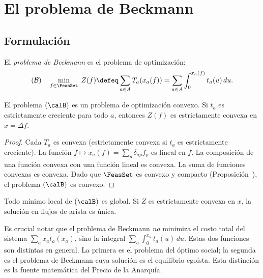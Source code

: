 \label{cap:beckmann}

\section{El problema de Beckmann}

\subsection{Formulación}


\begin{definition}\label{def:beckmann}
El \emph{problema de Beckmann} es el problema de optimización:
\begin{equation}\label{eq:beckmann}
(\mathcal{B}) \quad \min_{f \in \FeasSet} \; Z(f) \defeq \sum_{a \in A} T_a(x_a(f)) = \sum_{a \in A} \int_0^{x_a(f)} t_a(u) \, du.
\end{equation}
\end{definition}

\begin{proposition}\label{prop:beckmann_convex}
El problema $(\calB)$ es un problema de optimización convexo. Si $t_a$ es estrictamente creciente para todo $a$, entonces $Z(f)$ es estrictamente convexa en $x = \Delta f$.
\end{proposition}

\begin{proof}
Cada $T_a$ es convexa (estrictamente convexa si $t_a$ es estrictamente creciente). La función $f \mapsto x_a(f) = \sum_p \delta_{ap} f_p$ es lineal en $f$. La composición de una función convexa con una función lineal es convexa. La suma de funciones convexas es convexa. Dado que $\FeasSet$ es convexo y compacto (Proposición~), el problema $(\calB)$ es convexo.
\end{proof}

\begin{corollary}
Todo mínimo local de $(\calB)$ es global. Si $Z$ es estrictamente convexa en $x$, la solución en flujos de arista es única.
\end{corollary}

\begin{remark}
Es crucial notar que el problema de Beckmann \emph{no} minimiza el costo total del sistema $\sum_a x_a t_a(x_a)$, sino la integral $\sum_a \int_0^{x_a} t_a(u) \, du$. Estas dos funciones son distintas en general. La primera es el problema del óptimo social; la segunda es el problema de Beckmann cuya solución es el equilibrio egoísta. Esta distinción es la fuente matemática del Precio de la Anarquía.
\end{remark}

